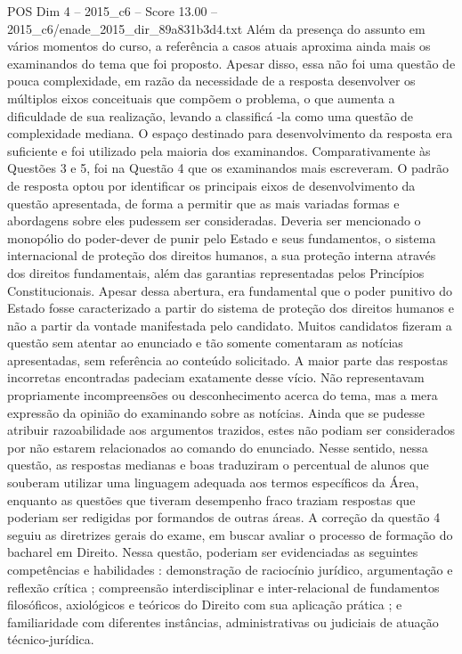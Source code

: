 \begin{textsample}{POS Dim 4 – 2015\_c6 – Score 13.00 – 2015\_c6/enade\_2015\_dir\_89a831b3d4.txt}
Além da presença do assunto em vários momentos do curso, a referência a casos atuais aproxima ainda mais os examinandos do tema que foi proposto.
Apesar disso, essa não foi uma questão de pouca complexidade, em razão da necessidade de a resposta desenvolver os múltiplos eixos conceituais que compõem o problema, o que aumenta a dificuldade de sua realização, levando a classificá -la como uma questão de complexidade mediana.
O espaço destinado para desenvolvimento da resposta era suficiente e foi utilizado pela maioria dos examinandos.
Comparativamente às Questões 3 e 5, foi na Questão 4 que os examinandos mais escreveram.
O padrão de resposta optou por identificar os principais eixos de desenvolvimento da questão apresentada, de forma a permitir que as mais variadas formas e abordagens sobre eles pudessem ser consideradas.
Deveria ser mencionado o monopólio do poder-dever de punir pelo Estado e seus fundamentos, o sistema internacional de proteção dos direitos humanos, a sua proteção interna através dos direitos fundamentais, além das garantias representadas pelos Princípios Constitucionais.
Apesar dessa abertura, era fundamental que o poder punitivo do Estado fosse caracterizado a partir do sistema de proteção dos direitos humanos e não a partir da vontade manifestada pelo candidato.
Muitos candidatos fizeram a questão sem atentar ao enunciado e tão somente comentaram as notícias apresentadas, sem referência ao conteúdo solicitado.
A maior parte das respostas incorretas encontradas padeciam exatamente desse vício.
Não representavam propriamente incompreensões ou desconhecimento acerca do tema, mas a mera expressão da opinião do examinando sobre as notícias.
Ainda que se pudesse atribuir razoabilidade aos argumentos trazidos, estes não podiam ser considerados por não estarem relacionados ao comando do enunciado.
Nesse sentido, nessa questão, as respostas medianas e boas traduziram o percentual de alunos que souberam utilizar uma linguagem adequada aos termos específicos da Área, enquanto as questões que tiveram desempenho fraco traziam respostas que poderiam ser redigidas por formandos de outras áreas.
A correção da questão 4 seguiu as diretrizes gerais do exame, em buscar avaliar o processo de formação do bacharel em Direito.
Nessa questão, poderiam ser evidenciadas as seguintes competências e habilidades : demonstração de raciocínio jurídico, argumentação e reflexão crítica ; compreensão interdisciplinar e inter-relacional de fundamentos filosóficos, axiológicos e teóricos do Direito com sua aplicação prática ; e familiaridade com diferentes instâncias, administrativas ou judiciais de atuação técnico-jurídica.

\end{textsample}
